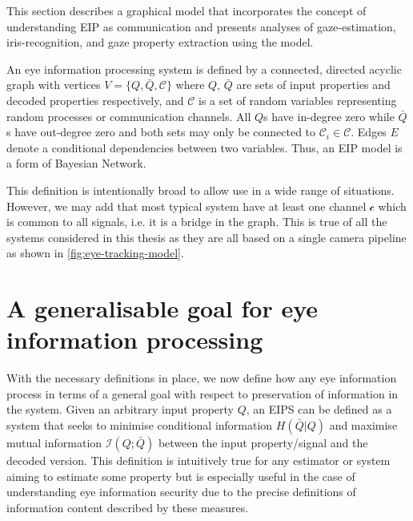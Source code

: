 This section describes a graphical model that incorporates the concept of understanding EIP as communication and presents analyses of gaze-estimation, iris-recognition, and gaze property extraction using the model.


An eye information processing system is defined by a connected, directed acyclic graph with vertices $V=\{Q, \bar{Q}, \mathcal{C}\}$ where $Q$, $\bar{Q}$ are sets of input properties and decoded properties respectively, and $\mathcal{C}$ is a set of random variables representing random processes or communication channels. All $Q$s have in-degree zero  while $\bar{Q}$s have out-degree zero and both sets may only be connected to $\mathcal{C}_i \in \mathcal{C}$. Edges $E$ denote a conditional dependencies between two variables. Thus, an EIP model is a form of Bayesian Network.

This definition is intentionally broad to allow use in a wide range of situations. However, we may add that most typical system have at least one channel $\mathcal{c}$ which is common to all signals, i.e. it is a bridge in the graph. This is true of all the systems considered in this thesis as they are all based on a single camera pipeline as shown in \cref{fig:eye-tracking-model}.



\section{A generalisable goal for eye information processing}
With the necessary definitions in place, we now define how any eye information process in terms of a general goal with respect to preservation of information in the system. Given an arbitrary input property $Q$, an EIPS can be defined as a system that seeks to minimise conditional information $H(\bar{Q}|Q)$ and maximise mutual information $\mathcal{I}(Q;\bar{Q})$ between the input property/signal and the decoded version. This definition is intuitively true for any estimator or system aiming to estimate some property but is especially useful in the case of understanding eye information security due to the precise definitions of information content described by these measures.

